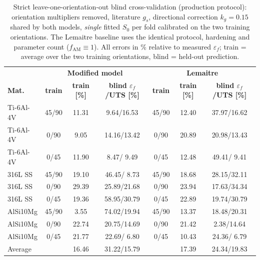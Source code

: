 \documentclass[twocolumn]{sagej}
\begin{document}
\begin{table}[htbp]
\centering
\caption{Strict leave-one-orientation-out blind cross-validation (production protocol): orientation multipliers removed, literature $g_s$, directional correction $k_g = 0.15$ shared by both models, \emph{single} fitted $S_0$ per fold calibrated on the two training orientations. The Lemaitre baseline uses the identical protocol, hardening and parameter count ($f_{\mathrm{AM}} \equiv 1$). All errors in \% relative to measured $\varepsilon_f$; train = average over the two training orientations, blind = held-out prediction.}
\label{tab:loocv}
\footnotesize
\begin{tabular}{l c c c | c c c}
\hline
 & \multicolumn{3}{c|}{\textbf{Modified model}} & \multicolumn{3}{c}{\textbf{Lemaitre}} \\
\textbf{Mat.} & \textbf{train} & \textbf{train [\%]} & \textbf{blind $\varepsilon_f$/UTS [\%]} & \textbf{train} & \textbf{train [\%]} & \textbf{blind $\varepsilon_f$/UTS [\%]} \\
\hline
Ti-6Al-4V & 45/90 & 11.31 &  9.64/16.53 & 45/90 & 12.40 & 37.97/16.62 \\
Ti-6Al-4V & 0/90 &  9.05 & 14.16/13.42 & 0/90 & 20.89 & 20.98/13.43 \\
Ti-6Al-4V & 0/45 & 11.90 &  8.47/ 9.49 & 0/45 & 12.48 & 49.41/ 9.41 \\
316L SS & 45/90 & 19.10 & 46.45/ 8.73 & 45/90 & 18.68 & 28.15/32.11 \\
316L SS & 0/90 & 29.39 & 25.89/21.68 & 0/90 & 23.94 & 17.63/34.34 \\
316L SS & 0/45 & 19.36 & 58.95/30.79 & 0/45 & 22.89 & 19.74/30.79 \\
AlSi10Mg & 45/90 &  3.55 & 74.02/19.94 & 45/90 & 13.37 & 18.48/20.31 \\
AlSi10Mg & 0/90 & 22.74 & 20.75/14.69 & 0/90 & 21.42 &  2.38/14.64 \\
AlSi10Mg & 0/45 & 21.77 & 22.69/ 6.80 & 0/45 & 10.43 & 24.36/ 6.79 \\
\hline
Average   &       & 16.46 & 31.22/15.79 &       & 17.39 & 24.34/19.83 \\
\hline
\end{tabular}
\end{table}
\end{document}
